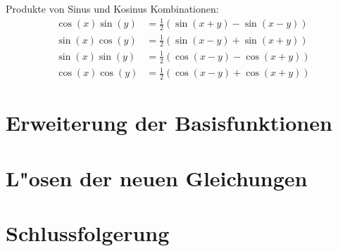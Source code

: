 \begin{refsection}
Produkte von Sinus und Kosinus Kombinationen:
\begin{align*}
\cos(x)\sin(y) &= \frac{1}{2} \left(\sin(x + y) - \sin(x - y)\right)
\\
\sin(x)\cos(y) &= \frac{1}{2} \left(\sin(x - y) + \sin(x + y)\right)
\\
\sin(x)\sin(y) &= \frac{1}{2} \left(\cos(x - y) - \cos(x + y)\right)
\\
\cos(x)\cos(y) &= \frac{1}{2} \left(\cos(x - y) + \cos(x + y)\right)
\end{align*}

\section{Erweiterung der Basisfunktionen\label{section:lorenz2:basic_function}}


\section{L"osen der neuen Gleichungen\label{section:lorenz2:new_equations}}



\section{Schlussfolgerung}

\printbibliography[heading=subbibliography]
\end{refsection}
